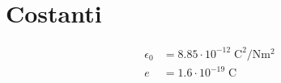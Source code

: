 \section{Costanti} %
\label{sec:costanti}

\begin{align}
    \epsilon_0  &= 8.85     \cdot 10^{-12}  \; \mathrm{ C^2 / N m^2 }\\
    e           &= 1.6      \cdot 10^{-19}  \; \mathrm{ C }\\
\end{align}

